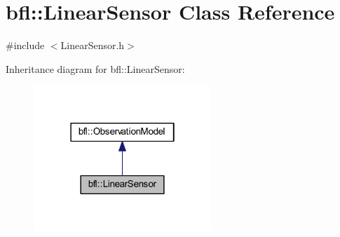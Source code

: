 \hypertarget{classbfl_1_1LinearSensor}{}\section{bfl\+:\+:Linear\+Sensor Class Reference}
\label{classbfl_1_1LinearSensor}


{\ttfamily \#include $<$Linear\+Sensor.\+h$>$}



Inheritance diagram for bfl\+:\+:Linear\+Sensor\+:
\nopagebreak
\begin{figure}[H]
\begin{center}
\leavevmode
\includegraphics[width=190pt]{classbfl_1_1LinearSensor__inherit__graph}
\end{center}
\end{figure}
